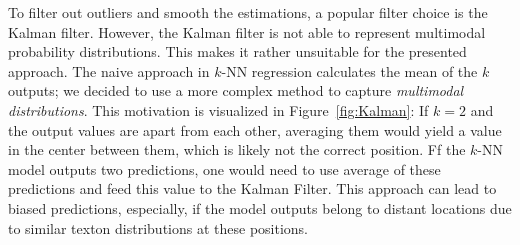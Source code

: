 \documentclass{report}
\begin{document}
To filter out outliers and smooth the estimations, a popular filter
choice is the Kalman filter. However, the Kalman filter is not able to
represent multimodal probability distributions. This makes it rather
unsuitable for the presented approach. The naive approach in $k$-NN
regression calculates the mean of the $k$ outputs; we decided to use a
more complex method to capture \emph{multimodal distributions}. This
motivation is visualized in Figure~\ref{fig:Kalman}: If $k=2$ and the
output values are apart from each other, averaging them would yield a
value in the center between them, which is likely not the correct
position. Ff the $k$-NN model outputs two predictions, one would need
to use average of these predictions and feed this value to the Kalman
Filter. This approach can lead to biased predictions, especially, if
the model outputs belong to distant locations due to similar texton
distributions at these positions.
\end{document}
